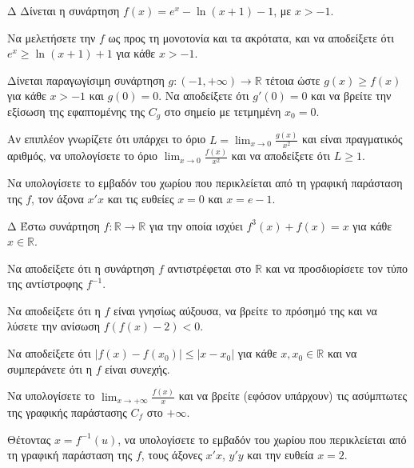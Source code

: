 \begin{thema}{Δ}
Δίνεται η συνάρτηση $f(x) = e^x - \ln(x+1) - 1$, με $x > -1$.
\begin{erwthma}
    \item Να μελετήσετε την $f$ ως προς τη μονοτονία και τα ακρότατα, και να αποδείξετε ότι $e^x \ge \ln(x+1) + 1$ για κάθε $x > -1$.
    \item Δίνεται παραγωγίσιμη συνάρτηση $g: (-1, +\infty) \to \mathbb{R}$ τέτοια ώστε $g(x) \ge f(x)$ για κάθε $x > -1$ και $g(0) = 0$. Να αποδείξετε ότι $g'(0) = 0$ και να βρείτε την εξίσωση της εφαπτομένης της $C_g$ στο σημείο με τετμημένη $x_0 = 0$.
    \item Αν επιπλέον γνωρίζετε ότι υπάρχει το όριο $\displaystyle L = \lim_{x\to 0} \frac{g(x)}{x^2}$ και είναι πραγματικός αριθμός, να υπολογίσετε το όριο $\displaystyle \lim_{x\to 0} \frac{f(x)}{x^2}$ και να αποδείξετε ότι $L \ge 1$.
    \item Να υπολογίσετε το εμβαδόν του χωρίου που περικλείεται από τη γραφική παράσταση της $f$, τον άξονα $x'x$ και τις ευθείες $x=0$ και $x=e-1$.
\end{erwthma}
\end{thema}

\begin{thema}{Δ}
Έστω συνάρτηση $f:\mathbb{R}\to\mathbb{R}$ για την οποία ισχύει $f^3(x) + f(x) = x$ για κάθε $x \in \mathbb{R}$.
\begin{erwthma}
    \item Να αποδείξετε ότι η συνάρτηση $f$ αντιστρέφεται στο $\mathbb{R}$ και να προσδιορίσετε τον τύπο της αντίστροφης $f^{-1}$.
    \item Να αποδείξετε ότι η $f$ είναι γνησίως αύξουσα, να βρείτε το πρόσημό της και να λύσετε την ανίσωση $f(f(x) - 2) < 0$.
    \item Να αποδείξετε ότι $|f(x) - f(x_0)| \le |x - x_0|$ για κάθε $x, x_0 \in \mathbb{R}$ και να συμπεράνετε ότι η $f$ είναι συνεχής.
    \item Να υπολογίσετε το $\displaystyle\lim_{x\to +\infty} \frac{f(x)}{x}$ και να βρείτε (εφόσον υπάρχουν) τις ασύμπτωτες της γραφικής παράστασης $C_f$ στο $+\infty$.
    \item Θέτοντας $x = f^{-1}(u)$, να υπολογίσετε το εμβαδόν του χωρίου που περικλείεται από τη γραφική παράσταση της $f$, τους άξονες $x'x$, $y'y$ και την ευθεία $x=2$.
\end{erwthma}
\end{thema}

